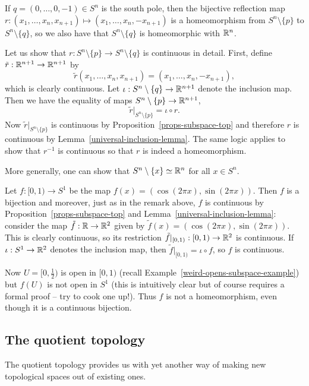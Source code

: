 \begin{rem}
  \label{south-pole-removed}
  If $q = (0,\dots,0,-1) \in S^n$ is the south pole, then the bijective reflection map $r: (x_1, \dots, x_n,x_{n+1}) \mapsto (x_1,\dots,x_n,-x_{n+1})$ is a homeomorphism from $S^n \setminus \{p\}$ to $S^n \setminus \{ q \}$, so we also have that $S^n \setminus \{ q \}$ is homeomorphic with $\mathbb{R}^n$.
  
  Let us show that $r : S^n \setminus \{p \} \to S^n \setminus \{q\}$ is continuous in detail. First, define $\tilde{r} : \mathbb{R}^{n+1} \to \mathbb{R}^{n+1}$ by
  \[
    \tilde{r}(x_1, \dots, x_n,x_{n+1}) = (x_1, \dots, x_n,-x_{n+1}),
  \]
  which is clearly continuous. Let $\iota : S^n \setminus \{q\} \to \mathbb{R}^{n+1}$ denote the inclusion map. Then we have the equality of maps $S^n \setminus \{p\} \to \mathbb{R}^{n+1}$,
  \[
    \tilde{r}|_{S^n \setminus \{p \}} = \iota \circ r.
  \]
  Now $\tilde{r}|_{S^n \setminus \{p \}}$ is continuous by Proposition~\ref{props-subspace-top} and therefore $r$ is continuous by Lemma~\ref{universal-inclusion-lemma}. The same logic applies to show that $r^{-1}$ is continuous so that $r$ is indeed a homeomorphism.
  
  More generally, one can show that $S^n \setminus \{x\} \simeq \mathbb{R}^n$ for all $x \in S^n$.
\end{rem}
\begin{example}
  \label{not-quotient-map}
  Let $f : [0,1) \to S^1$ be the map $f(x) = (\cos (2\pi x), \sin(2\pi x))$. Then $f$ is a bijection and moreover, just as in the remark above, $f$ is continuous by Proposition~\ref{props-subspace-top} and Lemma~\ref{universal-inclusion-lemma}: consider the map $\tilde{f} : \mathbb{R} \to \mathbb{R}^2$ given by $\tilde{f}(x) = (\cos (2\pi x), \sin(2\pi x))$. This is clearly continuous, so its restriction $\tilde{f}|_{[0,1)} : [0,1) \to \mathbb{R}^2$ is continuous. If $\iota : S^1 \to \mathbb{R}^2$ denotes the inclusion map, then $\tilde{f}|_{[0,1)} = \iota \circ f$, so $f$ is continuous.
  
  Now $U = [0,\tfrac{1}{2})$ is open in $[0,1)$ (recall Example~\ref{weird-opens-subspace-example}) but $f(U)$ is not open in $S^1$ (this is intuitively clear but of course requires a formal proof -- try to cook one up!). Thus $f$ is not a homeomorphism, even though it is a continuous bijection.
\end{example}

\subsection{The quotient topology}
The quotient topology provides us with yet another way of making new topological spaces out of existing ones.

